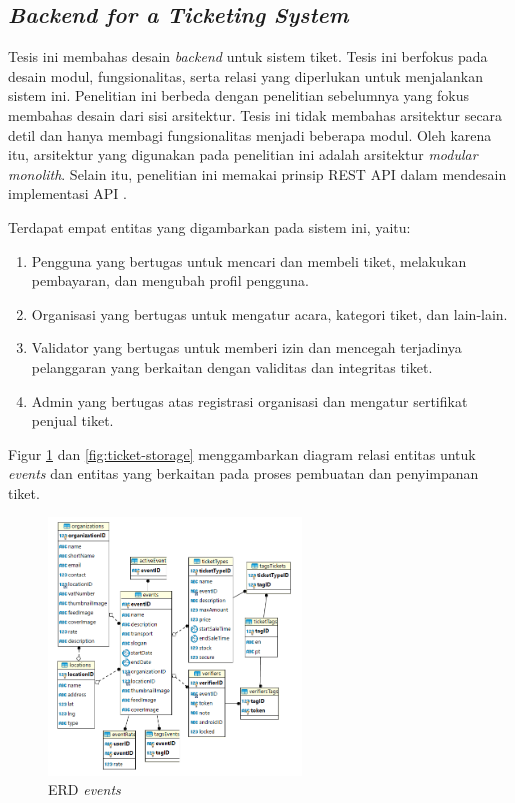\subsection{\textit{Backend for a Ticketing System}}

Tesis ini membahas desain \textit{backend} untuk sistem tiket. Tesis ini berfokus pada desain modul, fungsionalitas, serta relasi yang diperlukan untuk menjalankan sistem ini. Penelitian ini berbeda dengan penelitian sebelumnya yang fokus membahas desain dari sisi arsitektur. Tesis ini tidak membahas arsitektur secara detil dan hanya membagi fungsionalitas menjadi beberapa modul. Oleh karena itu, arsitektur yang digunakan pada penelitian ini adalah arsitektur \textit{modular monolith}. Selain itu, penelitian ini memakai prinsip REST API dalam mendesain implementasi API \parencite{backendForTicketing}.

Terdapat empat entitas yang digambarkan pada sistem ini, yaitu:

\begin{enumerate}
    \item Pengguna yang bertugas untuk mencari dan membeli tiket, melakukan pembayaran, dan mengubah profil pengguna.
    \item Organisasi yang bertugas untuk mengatur acara, kategori tiket, dan lain-lain.
    \item Validator yang bertugas untuk memberi izin dan mencegah terjadinya pelanggaran yang berkaitan dengan validitas dan integritas tiket.
    \item Admin yang bertugas atas registrasi organisasi dan mengatur sertifikat penjual tiket.
\end{enumerate}

Figur \ref{fig:event-rm} dan \ref{fig:ticket-storage} menggambarkan diagram relasi entitas untuk \textit{events} dan entitas yang berkaitan pada proses pembuatan dan penyimpanan tiket.

\begin{figure}[htbp]
    \centering
    \includegraphics[width=0.6\textwidth]{resources/chapter-2/event-rm.png}
    \caption{ERD \textit{events} \parencite{backendForTicketing}}
    \label{fig:event-rm}
\end{figure}

